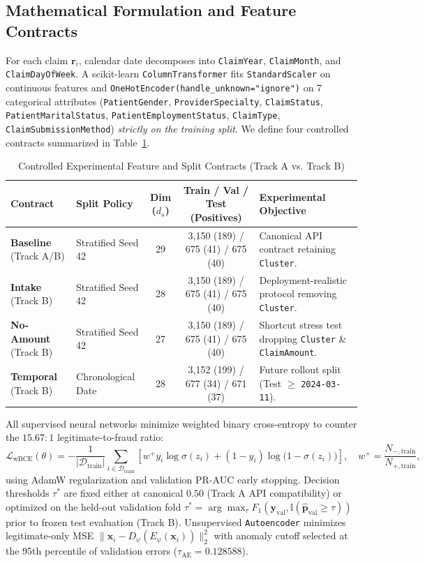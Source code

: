 \documentclass[12pt]{article}
\begin{document}
\subsection{Mathematical Formulation and Feature Contracts}
For each claim $\mathbf{r}_i$, calendar date decomposes into \texttt{ClaimYear}, \texttt{ClaimMonth}, and \texttt{ClaimDayOfWeek}. A scikit-learn \texttt{ColumnTransformer} fits \texttt{StandardScaler} on continuous features and \texttt{OneHotEncoder(handle\_unknown="ignore")} on 7 categorical attributes (\texttt{PatientGender}, \texttt{ProviderSpecialty}, \texttt{ClaimStatus}, \texttt{PatientMaritalStatus}, \texttt{PatientEmploymentStatus}, \texttt{ClaimType}, \texttt{ClaimSubmissionMethod}) \emph{strictly on the training split}. We define four controlled contracts summarized in Table~\ref{tab:contracts}.

\begin{table}[H]
\centering
\caption{Controlled Experimental Feature and Split Contracts (Track A vs. Track B)}
\label{tab:contracts}
\small
\begin{tabular}{@{}llccp{4.9cm}@{}}
\toprule
Contract & Split Policy & Dim ($d_s$) & Train / Val / Test (Positives) & Experimental Objective \\ \midrule
\textbf{Baseline} (Track A/B) & Stratified Seed 42 & 29 & 3,150 (189) / 675 (41) / 675 (40) & Canonical API contract retaining \texttt{Cluster}. \\
\textbf{Intake} (Track B) & Stratified Seed 42 & 28 & 3,150 (189) / 675 (41) / 675 (40) & Deployment-realistic protocol removing \texttt{Cluster}. \\
\textbf{No-Amount} (Track B) & Stratified Seed 42 & 27 & 3,150 (189) / 675 (41) / 675 (40) & Shortcut stress test dropping \texttt{Cluster} \& \texttt{ClaimAmount}. \\
\textbf{Temporal} (Track B) & Chronological Date & 28 & 3,152 (199) / 677 (34) / 671 (37) & Future rollout split (Test $\ge$ \texttt{2024-03-11}). \\ \bottomrule
\end{tabular}
\end{table}

All supervised neural networks minimize weighted binary cross-entropy to counter the $15.67:1$ legitimate-to-fraud ratio:
\begin{equation}
\mathcal{L}_{\text{wBCE}}(\theta) = -\frac{1}{|\mathcal{D}_{\text{train}}|}\sum_{i \in \mathcal{D}_{\text{train}}} \left[ w^+ y_i \log \sigma(z_i) + (1-y_i)\log\big(1-\sigma(z_i)\big) \right], \quad w^+ = \frac{N_{-,\text{train}}}{N_{+,\text{train}}},
\end{equation}
using AdamW regularization and validation PR-AUC early stopping. Decision thresholds $\tau^*$ are fixed either at canonical $0.50$ (Track A API compatibility) or optimized on the held-out validation fold $\tau^* = \arg\max_{\tau} F_1(\mathbf{y}_{\text{val}}, \mathbb{I}(\hat{\mathbf{p}}_{\text{val}} \ge \tau))$ prior to frozen test evaluation (Track B). Unsupervised \texttt{Autoencoder} minimizes legitimate-only MSE $\|\mathbf{x}_i - D_\psi(E_\psi(\mathbf{x}_i))\|_2^2$ with anomaly cutoff selected at the 95th percentile of validation errors ($\tau_{\text{AE}} = 0.128588$).
\end{document}
